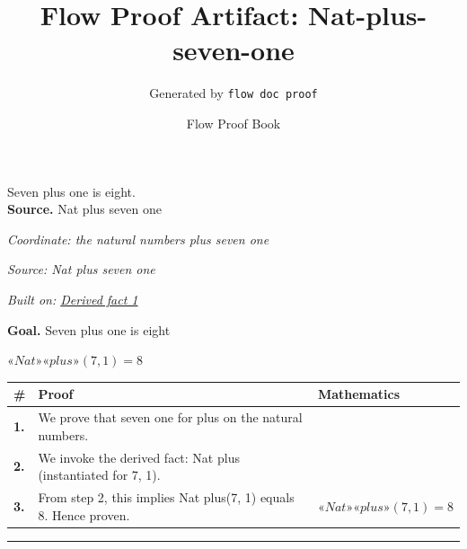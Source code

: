 \documentclass[11pt]{article}
\title{Flow Proof Artifact: Nat-plus-seven-one}
\author{Generated by \texttt{flow doc proof}}
\date{Flow Proof Book}
\theoremstyle{definition}
\begin{document}
\maketitle
Seven plus one is eight.\\[0.5em]
\textbf{Source.} Nat plus seven one\\[0.5em]
\bigskip
{}\par
\smallskip\noindent\textit{Coordinate: the natural numbers \cdot plus \cdot seven one}\par
\smallskip\noindent\textit{Source: Nat plus seven one}\par
\smallskip\noindent\textit{Built on: \hyperref[thm:Nat-plus-seven_one]{Derived fact 1}}\par
\medskip
\noindent\textbf{Goal.} Seven plus one is eight\par
\noindent$\displaystyle «Nat» «plus»(7, 1) = 8$\par
\medskip
\noindent
\begin{tabular}{@{} >{\raggedright\arraybackslash}p{} >{\raggedright\arraybackslash}p{} >{\raggedleft\arraybackslash}p{} @{}}
\textbf{\#} & \textbf{Proof} & \textbf{Mathematics} \\
\midrule
\textbf{1.} & We prove that seven one for plus on the natural numbers. & \\[0.45em]
\textbf{2.} & We invoke the derived fact: \guillemotleft{}Nat\guillemotright{} \guillemotleft{}plus\guillemotright{} (instantiated for 7, 1). & \\[0.45em]
\textbf{3.} & From step 2, this implies \guillemotleft{}Nat\guillemotright{} \guillemotleft{}plus\guillemotright{}(7, 1) equals 8. Hence proven. & $\displaystyle «Nat» «plus»(7, 1) = 8$ \\[0.45em]
\bottomrule
\end{tabular}
\label{thm:Nat-plus-seven_one}
\par\medskip\hrule
\end{document}
